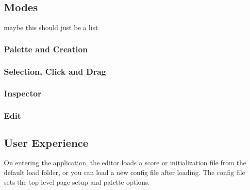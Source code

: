 \documentclass{article}
\begin{document}
\subsection{Modes}
maybe this should just be a list
\subsubsection{Palette and Creation}
\subsubsection{Selection, Click and Drag}
\subsubsection{Inspector}
\subsubsection{Edit}


\subsection{User Experience}\label{ux}

On entering the application, the editor loads a score or initialization file from the default load folder, or you can load a new config file after loading. The config file sets the top-level page setup and palette options.
\end{document}
